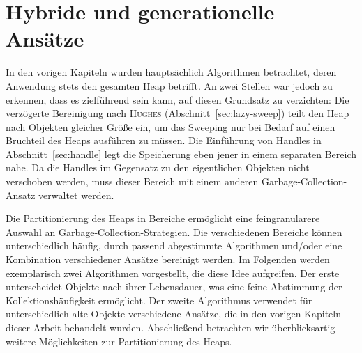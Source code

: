 \chapter{Hybride und generationelle Ansätze}
\label{cha:generational}

In den vorigen Kapiteln wurden hauptsächlich Algorithmen betrachtet, deren Anwendung stets den gesamten Heap betrifft.
An zwei Stellen war jedoch zu erkennen, dass es zielführend sein kann, auf diesen Grundsatz zu verzichten:
Die verzögerte Bereinigung nach \textsc{Hughes} (Abschnitt~\ref{sec:lazy-sweep}) teilt den Heap nach Objekten gleicher Größe ein, um das Sweeping nur bei Bedarf auf einen Bruchteil des Heaps ausführen zu müssen.
Die Einführung von Handles in Abschnitt~\ref{sec:handle} legt die Speicherung eben jener in einem separaten Bereich nahe.
Da die Handles im Gegensatz zu den eigentlichen Objekten nicht verschoben werden, muss dieser Bereich mit einem anderen Garbage-Collection-Ansatz verwaltet werden.

Die Partitionierung des Heaps in Bereiche ermöglicht eine feingranularere Auswahl an Garbage-Collection-Strategien.
Die verschiedenen Bereiche können unterschiedlich häufig, durch passend abgestimmte Algorithmen und/oder eine Kombination verschiedener Ansätze bereinigt werden.
Im Folgenden werden exemplarisch zwei Algorithmen vorgestellt, die diese Idee aufgreifen.
Der erste unterscheidet Objekte nach ihrer Lebensdauer, was eine feine Abstimmung der Kollektionshäufigkeit ermöglicht.
Der zweite Algorithmus verwendet für unterschiedlich alte Objekte verschiedene Ansätze, die in den vorigen Kapiteln dieser Arbeit behandelt wurden.
Abschließend betrachten wir überblicksartig weitere Möglichkeiten zur Partitionierung des Heaps.




